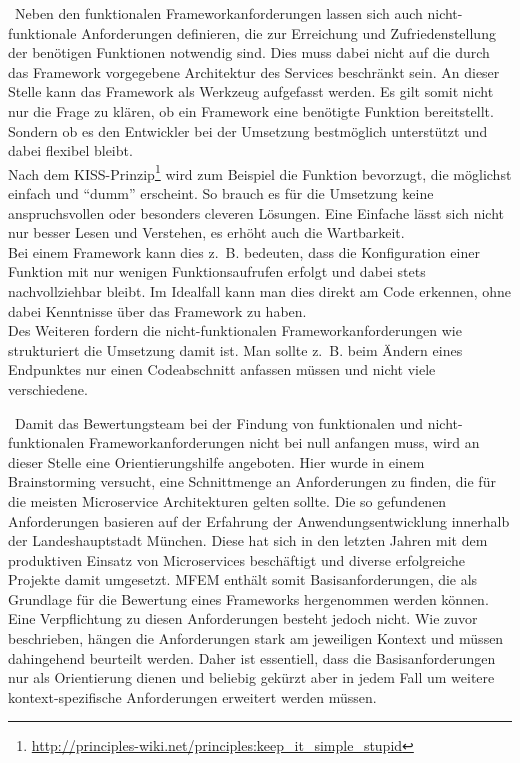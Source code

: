 \
Neben den funktionalen Frameworkanforderungen lassen sich auch nicht-funktionale Anforderungen definieren, die zur Erreichung und Zufriedenstellung der benötigen Funktionen notwendig sind. Dies muss dabei nicht auf die durch das Framework vorgegebene Architektur des Services beschränkt sein. An dieser Stelle kann das Framework als Werkzeug aufgefasst werden. Es gilt somit nicht nur die Frage zu klären, ob ein Framework eine benötigte Funktion bereitstellt. Sondern ob es den Entwickler bei der Umsetzung bestmöglich unterstützt und dabei flexibel bleibt.\\ 
Nach dem KISS-Prinzip\footnote{
\url{http://principles-wiki.net/principles:keep_it_simple_stupid}
} 
wird zum Beispiel die Funktion bevorzugt, die möglichst einfach und \enquote{dumm} erscheint. So brauch es für die Umsetzung keine anspruchsvollen oder besonders cleveren Lösungen. Eine Einfache lässt sich nicht nur besser Lesen und Verstehen, es erhöht auch die Wartbarkeit.\\
Bei einem Framework kann dies z.~B. bedeuten, dass die Konfiguration einer Funktion mit nur wenigen Funktionsaufrufen erfolgt und dabei stets nachvollziehbar bleibt. Im Idealfall kann man dies direkt am Code erkennen, ohne dabei Kenntnisse über das Framework zu haben.\\
Des Weiteren fordern die nicht-funktionalen Frameworkanforderungen wie strukturiert die Umsetzung damit ist. Man sollte z.~B. beim Ändern eines Endpunktes nur einen Codeabschnitt anfassen müssen und nicht viele verschiedene. 

\
Damit das Bewertungsteam bei der Findung von funktionalen und nicht-funktionalen Frameworkanforderungen nicht bei null anfangen muss, wird an dieser Stelle eine Orientierungshilfe angeboten. Hier wurde in einem Brainstorming versucht, eine Schnittmenge an Anforderungen zu finden, die für die meisten Microservice Architekturen gelten sollte. 
Die so gefundenen Anforderungen basieren auf der Erfahrung der Anwendungsentwicklung innerhalb der Landeshauptstadt München. Diese hat sich in den letzten Jahren mit dem produktiven Einsatz von Microservices beschäftigt und diverse erfolgreiche Projekte damit umgesetzt.
\ac{MFEM} enthält somit Basisanforderungen, die als Grundlage für die Bewertung eines Frameworks hergenommen werden können. Eine Verpflichtung zu diesen Anforderungen besteht jedoch nicht. Wie zuvor beschrieben, hängen die Anforderungen stark am jeweiligen Kontext und müssen dahingehend beurteilt werden. Daher ist essentiell, dass die Basisanforderungen nur als Orientierung dienen und beliebig gekürzt aber in jedem Fall um weitere kontext-spezifische Anforderungen erweitert werden müssen.  

